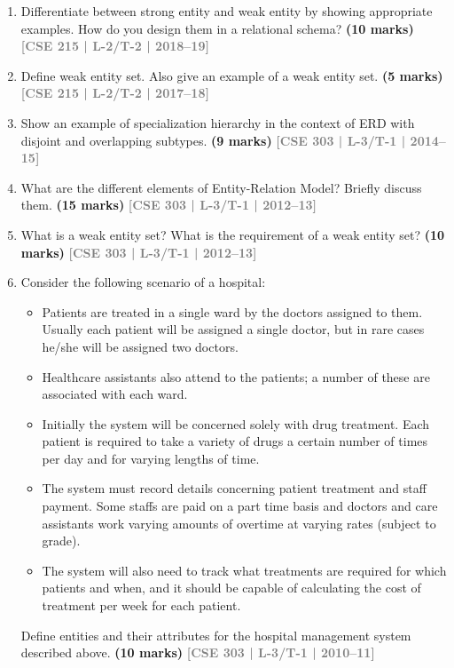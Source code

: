\documentclass[12pt]{article}
\newcommand{\yr}[1]{\hfill\textcolor{gray}{\small\textbf{[#1]}}}
\newcommand{\mk}[1]{\textcolor{orange!70!black}{\small\textbf{(#1 marks)}}}
\begin{document}
\begin{enumerate}


\item Differentiate between strong entity and weak entity by showing appropriate examples. How do you design them in a relational schema?
\mk{10} \yr{CSE 215 | L-2/T-2 | 2018--19}


\item Define weak entity set. Also give an example of a weak entity set.
\mk{5} \yr{CSE 215 | L-2/T-2 | 2017--18}






\item Show an example of specialization hierarchy in the context of ERD with disjoint and overlapping subtypes.
\mk{9} \yr{CSE 303 | L-3/T-1 | 2014--15}




\item What are the different elements of Entity-Relation Model? Briefly discuss them.
\mk{15} \yr{CSE 303 | L-3/T-1 | 2012--13}


\item What is a weak entity set? What is the requirement of a weak entity set?
\mk{10} \yr{CSE 303 | L-3/T-1 | 2012--13}


\item Consider the following scenario of a hospital:

\begin{itemize}[leftmargin=1.5em,itemsep=2pt]
  \item Patients are treated in a single ward by the doctors assigned to them. Usually each patient will be assigned a single doctor, but in rare cases he/she will be assigned two doctors.
  \item Healthcare assistants also attend to the patients; a number of these are associated with each ward.
  \item Initially the system will be concerned solely with drug treatment. Each patient is required to take a variety of drugs a certain number of times per day and for varying lengths of time.
  \item The system must record details concerning patient treatment and staff payment. Some staffs are paid on a part time basis and doctors and care assistants work varying amounts of overtime at varying rates (subject to grade).
  \item The system will also need to track what treatments are required for which patients and when, and it should be capable of calculating the cost of treatment per week for each patient.
\end{itemize}

Define entities and their attributes for the hospital management system described above.
\mk{10} \yr{CSE 303 | L-3/T-1 | 2010--11}


\end{enumerate}
\end{document}
